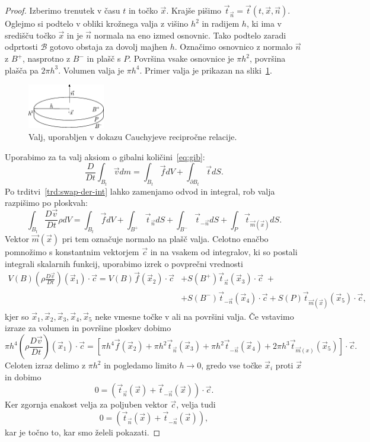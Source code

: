 \documentclass[12pt,a4paper,twoside]{article}
\theoremstyle{definition} %
\theoremstyle{plain} %
\numberwithin{equation}{section}
\newcommand{\B}{\mathcal{B}}
\newcommand{\DD}[2]{\ensuremath{\frac{D #1}{D #2}}}
\newcommand{\DDt}[1]{\DD{#1}{t}}
\newcommand{\vv}{\vec{v}}
\newcommand{\vt}{\vec{t}}
\newcommand{\vc}{\vec{c}}
\newcommand{\vn}{\vec{n}}
\newcommand{\vf}{\vec{f}}
\newcommand{\vm}{\vec{m}}
\newcommand{\vx}{\vec{x}}
\begin{document}
\begin{proof}
Izberimo trenutek v času $t$ in točko $\vx$. Krajše pišimo $\vt_{\vn} = \vt(t, \vx,
\vn)$. Oglejmo si podtelo v obliki krožnega valja z višino $h^2$ in radijem $h$, ki ima
v središču točko $\vx$ in je $\vn$ normala na eno izmed osnovnic.
Tako podtelo zaradi odprtosti $\B$ gotovo obstaja za dovolj majhen $h$. Označimo
osnovnico z normalo $\vn$ z $B^+$, nasprotno z $B^-$ in plašč s $P$. Površina
vsake osnovnice je $\pi h^2$, površina plašča pa $2 \pi h^3$. Volumen valja je
$\pi h^4$. Primer valja je prikazan na sliki~\ref{fig:valj}.

\begin{figure}[h]
  \centering
  \includegraphics[width=0.3\textwidth]{images/cauchy_disc.pdf}
  \caption{Valj, uporabljen v dokazu Cauchyjeve recipročne relacije.}
  \label{fig:valj}
\end{figure}

Uporabimo za ta
valj aksiom o gibalni količini~\eqref{eq:gib}:
\[  \DDt{} \int_{B_t} \vv dm = \int_{B_t} \vf dV + \int_{\partial B_t} \vt dS. \]
Po trditvi~\ref{trd:swap-der-int} lahko zamenjamo odvod in integral, rob valja
razpišimo po ploskvah:
\[
  \int_{B_t} \DDt{\vv} \rho dV = \int_{B_t} \vf dV + \int_{B^+} \vt_{\vn} dS +
  \int_{B^-}\vt_{-\vn} dS + \int_{P} \vt_{\vm(\vx)}dS.
\]
Vektor $\vm(\vx)$ pri tem označuje normalo na plašč valja. Celotno enačbo pomnožimo s konstantnim
vektorjem $\vc$ in na vsakem od integralov, ki so postali integrali skalarnih funkcij, uporabimo izrek
o povprečni vrednosti
\begin{align*}
  V(B) (\rho\DDt{\vv})(\vx_1)\cdot\vc = V(B) \vf(\vx_2)\cdot\vc &+ S(B^+)\vt_{\vn}(\vx_3)\cdot\vc\;+ \\&+
  S(B^-)\vt_{-\vn}(\vx_4)\cdot\vc + S(P)\vt_{\vm(\vx)}(\vx_5)\cdot\vc,
\end{align*}
kjer so $\vx_1, \vx_2, \vx_3, \vx_4, \vx_5$ neke vmesne točke v ali na površini valja.
Če vstavimo izraze za volumen in površine ploskev dobimo
\[
  \pi h^4 (\rho \DDt{\vv})(\vx_1)\cdot\vc = \left[\pi h^4 \vf(\vx_2) + \pi h^2 \vt_{\vn}(\vx_3) +
  \pi h^2 \vt_{-\vn}(\vx_4) + 2 \pi h^3 \vt_{\vm(x)}(\vx_5)\right]\cdot\vc.
\]
Celoten izraz delimo z $\pi h^2$ in pogledamo limito $h\to 0$, gredo vse točke
$\vx_i$ proti $\vx$ in dobimo
\[
  0 = (\vt_{\vn}(\vx) + \vt_{-\vn}(\vx))\cdot\vc.
\]
Ker zgornja enakost velja za poljuben vektor $\vc$, velja tudi
\[
  0 = (\vt_{\vn}(\vx) + \vt_{-\vn}(\vx)),
\]
kar je točno to, kar smo želeli pokazati.
\end{proof}
\end{document}
